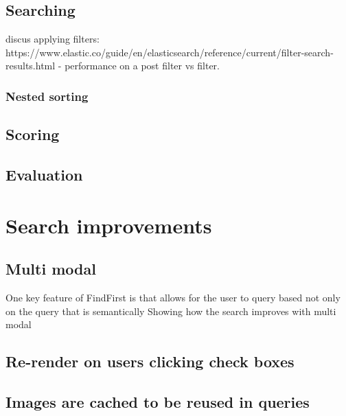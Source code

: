 \documentclass[article, 10pt]{article}
\begin{document}
\subsection{Searching}
discus applying filters: https://www.elastic.co/guide/en/elasticsearch/reference/current/filter-search-results.html
  - performance on a post filter vs filter.
\subsubsection{Nested sorting}
\subsection{Scoring}

\subsection{Evaluation}



\section{Search improvements}
\subsection{Multi modal}
One key feature of FindFirst is that allows for the user to query based not only on the 
query that is semantically 
Showing how the search improves with multi modal 
\subsection{Re-render on users clicking check boxes}
\subsection{Images are cached to be reused in queries}
\end{document}
